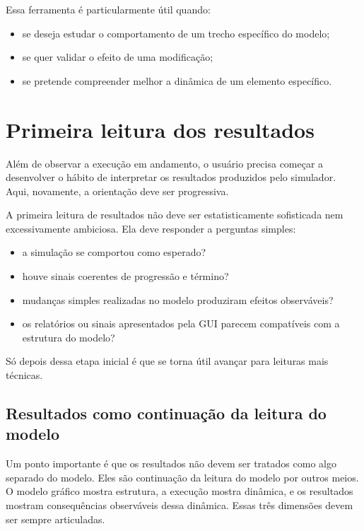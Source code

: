 Essa ferramenta é particularmente útil quando:
\begin{itemize}
    \item se deseja estudar o comportamento de um trecho específico do modelo;
    \item se quer validar o efeito de uma modificação;
    \item se pretende compreender melhor a dinâmica de um elemento específico.
\end{itemize}

\section{Primeira leitura dos resultados}
\label{sec:cap5_primeira_leitura_resultados}

Além de observar a execução em andamento, o usuário precisa começar a desenvolver o hábito de interpretar os resultados produzidos pelo simulador. Aqui, novamente, a orientação deve ser progressiva.

A primeira leitura de resultados não deve ser estatisticamente sofisticada nem excessivamente ambiciosa. Ela deve responder a perguntas simples:
\begin{itemize}
    \item a simulação se comportou como esperado?
    \item houve sinais coerentes de progressão e término?
    \item mudanças simples realizadas no modelo produziram efeitos observáveis?
    \item os relatórios ou sinais apresentados pela GUI parecem compatíveis com a estrutura do modelo?
\end{itemize}

Só depois dessa etapa inicial é que se torna útil avançar para leituras mais técnicas.

\subsection{Resultados como continuação da leitura do modelo}
\label{subsec:cap5_resultados_continuacao_leitura}

Um ponto importante é que os resultados não devem ser tratados como algo separado do modelo. Eles são continuação da leitura do modelo por outros meios. O modelo gráfico mostra estrutura, a execução mostra dinâmica, e os resultados mostram consequências observáveis dessa dinâmica. Essas três dimensões devem ser sempre articuladas.


